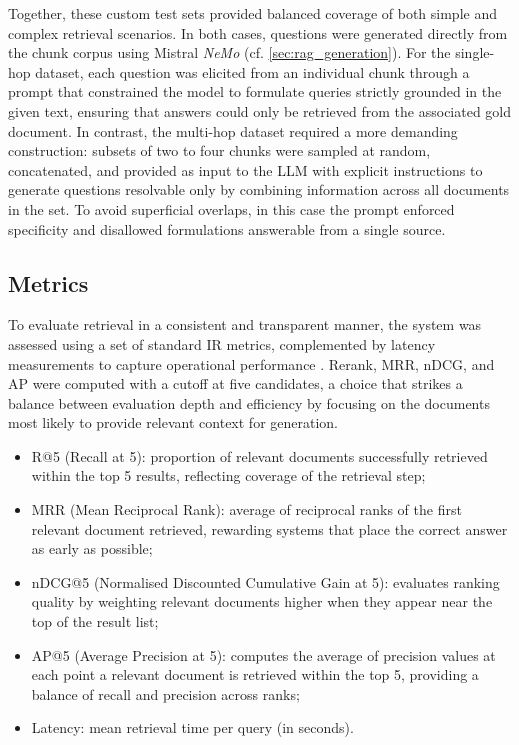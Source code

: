 \begin{spacing}{1.5}
Together, these custom test sets provided balanced coverage of both simple and complex retrieval scenarios. In both cases, questions were generated directly from the chunk corpus using Mistral \textit{NeMo} (cf. \autoref{sec:rag_generation}). For the single-hop dataset, each question was elicited from an individual chunk through a prompt that constrained the model to formulate queries strictly grounded in the given text, ensuring that answers could only be retrieved from the associated gold document. In contrast, the multi-hop dataset required a more demanding construction: subsets of two to four chunks were sampled at random, concatenated, and provided as input to the LLM with explicit instructions to generate questions resolvable only by combining information across all documents in the set. To avoid superficial overlaps, in this case the prompt enforced specificity and disallowed formulations answerable from a single source.


\subsection{Metrics}\label{sec:metrics}
To evaluate retrieval in a consistent and transparent manner, the system was assessed using a set of standard IR metrics, complemented by latency measurements to capture operational performance \citep{wang_searching_2024}.
Rerank, MRR, nDCG, and AP were computed with a cutoff at five candidates, a choice that strikes a balance between evaluation depth and efficiency by focusing on the documents most likely to provide relevant context for generation.

\begin{itemize}
    \item R@5 (Recall at 5): proportion of relevant documents successfully retrieved within the top 5 results, reflecting coverage of the retrieval step;
    \item MRR (Mean Reciprocal Rank): average of reciprocal ranks of the first relevant document retrieved, rewarding systems that place the correct answer as early as possible;
    \item nDCG@5 (Normalised Discounted Cumulative Gain at 5): evaluates ranking quality by weighting relevant documents higher when they appear near the top of the result list;
    \item AP@5 (Average Precision at 5): computes the average of precision values at each point a relevant document is retrieved within the top 5, providing a balance of recall and precision across ranks;
    \item Latency: mean retrieval time per query (in seconds).
\end{itemize}


\end{spacing}
